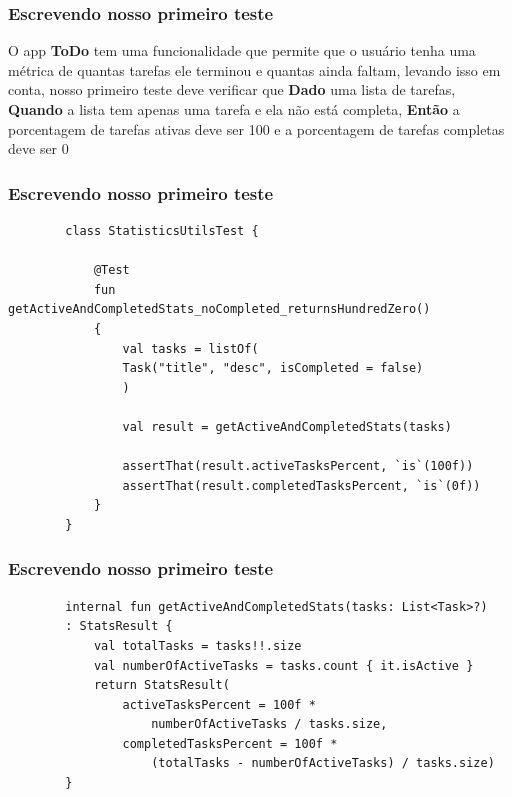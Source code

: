 \documentclass{beamer}
\begin{document}
\begin{frame}
	\frametitle{Escrevendo nosso primeiro teste}
	O app \textbf{ToDo} tem uma funcionalidade que permite que o usuário tenha uma métrica de quantas tarefas ele terminou e quantas ainda faltam, levando isso em conta, nosso primeiro teste deve verificar que \textbf{Dado} uma lista de tarefas, \textbf{Quando} a lista tem  apenas uma tarefa e ela não está completa, \textbf{Então} a porcentagem de tarefas ativas deve ser 100 e a porcentagem de tarefas completas deve ser 0
\end{frame}

\begin{frame}[fragile]
	\frametitle{Escrevendo nosso primeiro teste}
		\begin{example}
		\begin{lstlisting}
		class StatisticsUtilsTest {
		
			@Test
			fun getActiveAndCompletedStats_noCompleted_returnsHundredZero() 
			{
				val tasks = listOf(
				Task("title", "desc", isCompleted = false)
				)
				
				val result = getActiveAndCompletedStats(tasks)
				
				assertThat(result.activeTasksPercent, `is`(100f))
				assertThat(result.completedTasksPercent, `is`(0f))
			}
		}
		\end{lstlisting}
	\end{example}
	
\end{frame}

\begin{frame}[fragile]
	\frametitle{Escrevendo nosso primeiro teste}
	\begin{example}
		\begin{lstlisting}
		internal fun getActiveAndCompletedStats(tasks: List<Task>?)
		: StatsResult {
			val totalTasks = tasks!!.size
			val numberOfActiveTasks = tasks.count { it.isActive }
			return StatsResult(
				activeTasksPercent = 100f * 
					numberOfActiveTasks / tasks.size,
				completedTasksPercent = 100f * 
					(totalTasks - numberOfActiveTasks) / tasks.size)
		}
		\end{lstlisting}
	\end{example}
	
\end{frame}
\end{document}
